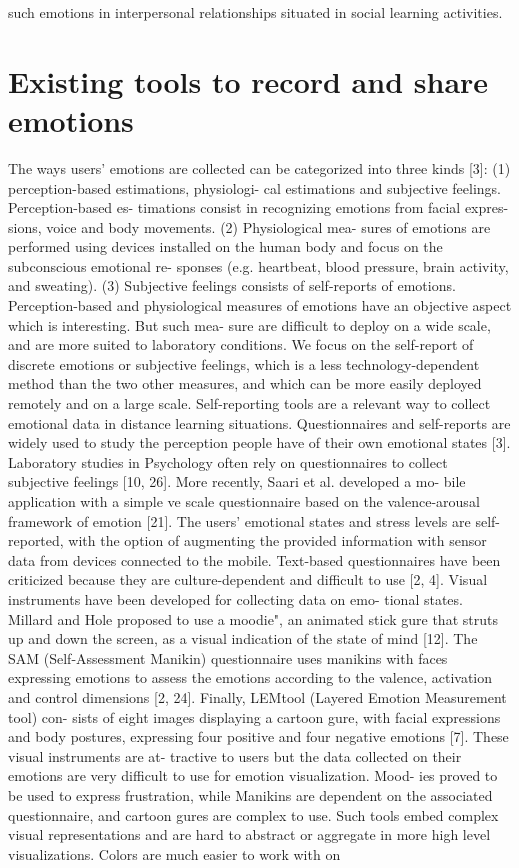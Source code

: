 \documentclass[chi_draft]{sigchi}
\begin{document}
such emotions in interpersonal relationships situated in social learning activities.

\section{Existing tools to record and share emotions}
The ways users’ emotions are collected can be categorized into three kinds [3]: (1) perception-based estimations, physiologi- cal estimations and subjective feelings. Perception-based es- timations consist in recognizing emotions from facial expres- sions, voice and body movements. (2) Physiological mea- sures of emotions are performed using devices installed on the human body and focus on the subconscious emotional re- sponses (e.g. heartbeat, blood pressure, brain activity, and sweating). (3) Subjective feelings consists of self-reports of emotions. Perception-based and physiological measures of emotions have an objective aspect which is interesting. But such mea- sure are difficult to deploy on a wide scale, and are more suited to laboratory conditions. We focus on the self-report of discrete emotions or subjective feelings, which is a less technology-dependent method than the two other measures, and which can be more easily deployed remotely and on a large scale. Self-reporting tools are a relevant way to collect emotional data in distance learning situations. Questionnaires and self-reports are widely used to study the perception people have of their own emotional states [3]. Laboratory studies in Psychology often rely on questionnaires to collect subjective feelings [10, 26]. More recently, Saari et al. developed a mo- bile application with a simple ve scale questionnaire based on the valence-arousal framework of emotion [21]. The users' emotional states and stress levels are self-reported, with the option of augmenting the provided information with sensor data from devices connected to the mobile. Text-based questionnaires have been criticized because they are culture-dependent and difficult to use [2, 4]. Visual instruments have been developed for collecting data on emo- tional states. Millard and Hole proposed to use a moodie", an animated stick gure that struts up and down the screen, as a visual indication of the state of mind [12]. The SAM (Self-Assessment Manikin) questionnaire uses manikins with faces expressing emotions to assess the emotions according to the valence, activation and control dimensions [2, 24]. Finally, LEMtool (Layered Emotion Measurement tool) con- sists of eight images displaying a cartoon gure, with facial expressions and body postures, expressing four positive and four negative emotions [7]. These visual instruments are at- tractive to users but the data collected on their emotions are very difficult to use for emotion visualization. Mood- ies proved to be used to express frustration, while Manikins are dependent on the associated questionnaire, and cartoon gures are complex to use. Such tools embed complex visual representations and are hard to abstract or aggregate in more high level visualizations. Colors are much easier to work with on 
\end{document}
